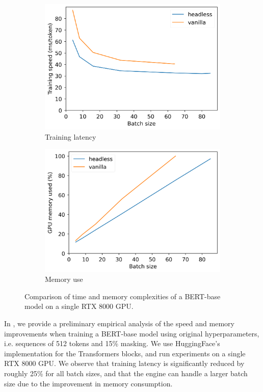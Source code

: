 \begin{figure}[h]
    \centering
    \begin{subfigure}{0.40\columnwidth}
         \includegraphics[width=\linewidth]{sources/part_2/headless/imgs/bert_train_speed_p13.png}
         \caption{Training latency}
         \label{fig:speedup}
    \end{subfigure}
    \begin{subfigure}{0.41\columnwidth}
         \includegraphics[width=\linewidth]{sources/part_2/headless/imgs/bert_memory_use_p13.png}
         \caption{Memory use}
         \label{fig:norm_scratch_transformer}
    \end{subfigure}
    \caption{Comparison of time and memory complexities of a BERT-base model on a single RTX 8000 GPU.}
    \label{fig:comparison}
\end{figure}
In , we provide a preliminary empirical analysis of the speed and memory improvements when training a BERT-base model using original hyperparameters, i.e. sequences of 512 tokens and 15\% masking. We use HuggingFace's implementation for the Transformers blocks, and run experiments on a single RTX 8000 GPU.
We observe that training latency is significantly reduced by roughly 25\% for all batch sizes, and that the engine can handle a larger batch size due to the improvement in memory consumption.

